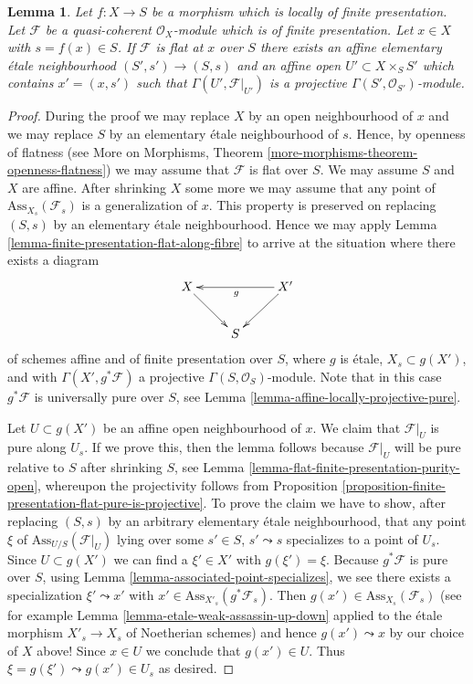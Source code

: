 \documentclass[10pt,a4paper]{amsart}
\theoremstyle{plain}
\newtheorem{lemma}[subsection]{Lemma}
\theoremstyle{definition}
\theoremstyle{remark}
\numberwithin{equation}{subsection}
\begin{document}
\begin{lemma}
\label{lemma-flat-finite-presentation-affine-neighbourhood-projective}
Let $f : X \to S$ be a morphism which is locally of finite presentation.
Let $\mathcal{F}$ be a quasi-coherent $\mathcal{O}_X$-module which is
of finite presentation. Let $x \in X$ with $s = f(x) \in S$.
If $\mathcal{F}$ is flat at $x$ over $S$ there exists an affine
elementary \'etale neighbourhood $(S', s') \to (S, s)$ and
an affine open $U' \subset X \times_S S'$ which contains $x' = (x, s')$
such that $\Gamma(U', \mathcal{F}|_{U'})$ is a projective
$\Gamma(S', \mathcal{O}_{S'})$-module.
\end{lemma}

\begin{proof}
During the proof we may replace $X$ by an open neighbourhood of $x$
and we may replace $S$ by an elementary \'etale neighbourhood of $s$.
Hence, by openness of flatness (see
More on Morphisms, Theorem \ref{more-morphisms-theorem-openness-flatness})
we may assume that $\mathcal{F}$ is flat over $S$.
We may assume $S$ and $X$ are affine.
After shrinking $X$ some more we may assume that any
point of $\text{Ass}_{X_s}(\mathcal{F}_s)$ is a generalization of $x$.
This property is preserved on replacing $(S, s)$ by an elementary
\'etale neighbourhood. Hence we may apply
Lemma \ref{lemma-finite-presentation-flat-along-fibre}
to arrive at the situation where there exists a diagram
$$
\xymatrix{
X \ar[dr] & & X' \ar[ll]^g \ar[ld] \\
& S &
}
$$
of schemes affine and of finite presentation over $S$,
where $g$ is \'etale, $X_s \subset g(X')$, and with
$\Gamma(X', g^*\mathcal{F})$ a projective $\Gamma(S, \mathcal{O}_S)$-module.
Note that in this case $g^*\mathcal{F}$ is universally pure over $S$, see
Lemma \ref{lemma-affine-locally-projective-pure}.

\medskip\noindent
Let $U \subset g(X')$ be an affine open neighbourhood of $x$.
We claim that $\mathcal{F}|_U$ is pure along $U_s$. If we prove this, then
the lemma follows because $\mathcal{F}|_U$ will be pure relative to $S$
after shrinking $S$, see
Lemma \ref{lemma-flat-finite-presentation-purity-open},
whereupon the projectivity follows from
Proposition \ref{proposition-finite-presentation-flat-pure-is-projective}.
To prove the claim we have to show, after replacing $(S, s)$
by an arbitrary elementary \'etale neighbourhood, that any point $\xi$ of
$\text{Ass}_{U/S}(\mathcal{F}|_U)$ lying over some
$s' \in S$, $s' \leadsto s$ specializes to a point of $U_s$.
Since $U \subset g(X')$ we can find a $\xi' \in X'$ with
$g(\xi') = \xi$. Because $g^*\mathcal{F}$ is pure over $S$, using
Lemma \ref{lemma-associated-point-specializes},
we see there exists a specialization $\xi' \leadsto x'$ with
$x' \in \text{Ass}_{X'_s}(g^*\mathcal{F}_s)$. Then
$g(x') \in \text{Ass}_{X_s}(\mathcal{F}_s)$ (see for example
Lemma \ref{lemma-etale-weak-assassin-up-down}
applied to the \'etale morphism $X'_s \to X_s$ of Noetherian schemes)
and hence $g(x') \leadsto x$ by our choice of $X$ above! Since
$x \in U$ we conclude that $g(x') \in U$. Thus
$\xi = g(\xi') \leadsto g(x') \in U_s$ as desired.
\end{proof}
\end{document}
